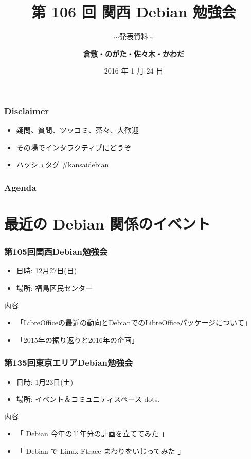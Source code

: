 \documentclass[cjk,dvipdfmx,10pt,compress,%
hyperref={bookmarks=true,bookmarksnumbered=true,bookmarksopen=false,%
colorlinks=false,%
pdftitle={第 106 回 関西 Debian 勉強会},%
pdfauthor={倉敷・のがた・佐々木・かわだ},%
pdfsubject={資料},%
}]{beamer}
\title{第 106 回 関西 Debian 勉強会}
\subtitle{$\sim$発表資料$\sim$}
\author[かわだ てつたろう]{{\large\bf 倉敷・のがた・佐々木・かわだ}}
\institute[Debian JP]{{\normalsize\tt 関西 Debian 勉強会}}
\date{{\small 2016 年 1 月 24 日}}
\begin{document}
\settitleslide
\begin{frame}
\titlepage
\end{frame}
\setdefaultslide

\begin{frame}[fragile]
  \frametitle{Disclaimer}
  \begin{itemize}
  \item 疑問、質問、ツッコミ、茶々、\alert{大歓迎}
  \item その場でインタラクティブにどうぞ
  \item ハッシュタグ \#kansaidebian
  \end{itemize}
\end{frame}

\begin{frame}[fragile]
\frametitle{Agenda}

\tableofcontents

\end{frame}

\section{最近の Debian 関係のイベント}


\begin{frame}[fragile]
  \frametitle{第105回関西Debian勉強会}
  \begin{itemize}
  \item 日時: 12月27日(日)
  \item 場所: 福島区民センター
  \end{itemize}
  \begin{block}{内容}
    \begin{itemize}
    \item 「LibreOfficeの最近の動向とDebianでのLibreOfficeパッケージについて」
    \item 「2015年の振り返りと2016年の企画」
    \end{itemize}
  \end{block}
\end{frame}

\begin{frame}[fragile]
  \frametitle{第135回東京エリアDebian勉強会}
  \begin{itemize}
  \item 日時: 1月23日(土)
  \item 場所: イベント＆コミュニティスペース dots.
  \end{itemize}
  \begin{block}{内容}
    \begin{itemize}
    \item 「 Debian 今年の半年分の計画を立ててみた 」
    \item 「 Debian で Linux Ftrace まわりをいじってみた 」
    \end{itemize}
  \end{block}
\end{frame}
\end{document}
